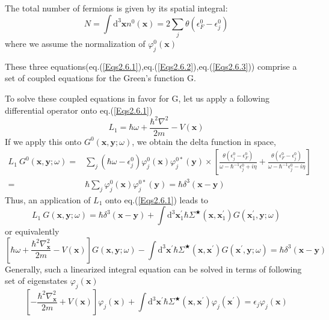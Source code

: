 The total number of fermions is given by its spatial integral:
\[ N = \int \mathrm{d}^{3}\mathbf{x} n^{0}(\mathbf{x}) = 2 \sum_{j} \theta(\epsilon_{F}^{0}-\epsilon_{j}^{0}) \]
where we assume the normalization of $\varphi_{j}^{0}(\mathbf{x})$

These three equations(eq.(\ref{Eqs2.6.1}),eq.(\ref{Eqs2.6.2}),eq.(\ref{Eqs2.6.3})) comprise a set of coupled equations for the Green's function G.

To solve these coupled equations in favor for G, let us apply a following differential operator onto eq.(\ref{Eqs2.6.1})
\[ L_{1} = \hbar \omega + \frac{\hbar^{2}\nabla^{2}}{2m} - V(\mathbf{x})\]
If we apply this onto $G^{0}(\mathbf{x},\mathbf{y};\omega)$, we obtain the delta function in space,
\[\begin{split} L_{1} \ G^{0}(\mathbf{x},\mathbf{y};\omega) =& \sum_{j}(\hbar\omega - \epsilon_{j}^{0})\varphi_{j}^{0}(\mathbf{x})\varphi_{j}^{0*}(\mathbf{y})
 \times \left[
\frac{\theta(\epsilon_{j}^{0}-\epsilon_{F}^{0})}{\omega-\hbar^{-1}\epsilon_{j}^{0}+i\eta} +\frac{\theta(\epsilon_{F}^{0}-\epsilon_{j}^{0})}{\omega-\hbar^{-1}\epsilon_{j}^{0}-i\eta}
 \right]\\
=& \hbar \sum_{j} \varphi_{j}^{0}(\mathbf{x})\varphi_{j}^{0*}(\mathbf{y}) = \hbar \delta^{3}(\mathbf{x}-\mathbf{y})
\end{split} \]
Thus, an application of $L_{1}$ onto eq.(\ref{Eqs2.6.1}) leads to
\[ L_{1} \ G(\mathbf{x},\mathbf{y};\omega) = \hbar\delta^{3}(\mathbf{x}-\mathbf{y}) + \int \mathrm{d}^{3}\mathbf{x}_{1}^{'} 
\hbar\Sigma^{\bigstar}(\mathbf{x},\mathbf{x}_{1}^{'})G(\mathbf{x}_{1}^{'},\mathbf{y};\omega) \]
or equivalently
\begin{equation}\label{Eqs2.6.4}
\left[ \hbar\omega + \frac{\hbar^{2}\nabla^{2}_{\mathbf{x}}}{2m} - V(\mathbf{x}) \right] G(\mathbf{x},\mathbf{y};\omega) - \int \mathrm{d}^{3} \mathbf{x}^{'} \hbar \Sigma^{\bigstar}(\mathbf{x},\mathbf{x}^{'})G(\mathbf{x}^{'},\mathbf{y};\omega) = \hbar\delta^{3}(\mathbf{x}-\mathbf{y})
\end{equation}
Generally, such a linearized integral equation can be solved in terms of following set of eigenstates $\varphi_{j}(\mathbf{x})$
\begin{equation} \label{Eqs2.6.5}
 \left[ -\frac{\hbar^{2}\nabla^{2}_{\mathbf{x}}}{2m} + V(\mathbf{x}) \right]\varphi_{j}(\mathbf{x})+\int \mathrm{d}^{3} \mathbf{x}^{'} \hbar \Sigma^{\bigstar}(\mathbf{x},\mathbf{x}^{'})\varphi_{j}(\mathbf{x}^{'})=\epsilon_{j}\varphi_{j}(\mathbf{x}) \end{equation}


